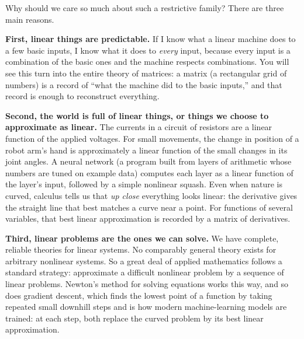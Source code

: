 Why should we care so much about such a restrictive family? There are three main reasons.

\textbf{First, linear things are predictable.} If I know what a linear machine does to a few basic
inputs, I know what it does to \emph{every} input, because every input is a combination of the basic
ones and the machine respects combinations. You will see this turn into the entire theory of
matrices: a matrix (a rectangular grid of numbers) is a record of ``what the machine did to the
basic inputs,'' and that record is enough to reconstruct everything.

\textbf{Second, the world is full of linear things, or things we choose to approximate as linear.}
The currents in a circuit of resistors are a linear function of the applied voltages. For small
movements, the change in position of a robot arm's hand is approximately a linear function of the
small changes in its joint angles. A neural network (a program built from layers of arithmetic whose
numbers are tuned on example data) computes each layer as a linear function of the layer's input,
followed by a simple nonlinear squash. Even when nature is curved,
calculus tells us that \emph{up close} everything looks linear: the derivative gives the straight line
that best matches a curve near a point. For functions of several variables, that best linear
approximation is recorded by a matrix of derivatives.

\textbf{Third, linear problems are the ones we can solve.} We have complete,
reliable theories for linear systems. No comparably general theory exists for arbitrary nonlinear
systems. So a great deal of applied mathematics follows a standard strategy:
approximate a difficult nonlinear problem by a sequence of linear problems. Newton's
method for solving equations works this way, and so does gradient descent, which finds the lowest
point of a function by taking repeated small downhill steps and is how modern machine-learning models
are trained: at each step, both replace the curved problem by its best linear approximation.

